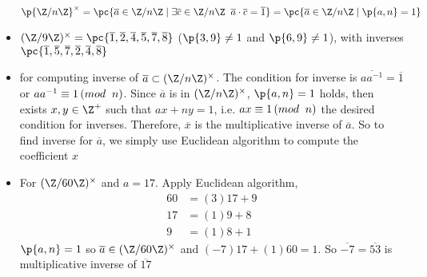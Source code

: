\documentclass[11pt]{article}
\begin{document}
\begin{definition*}
\begin{itemize}
        \[
            \p{\integermodn}^{\times} = \pc{
                \oa \in \integermodn \mid
                \exists \oc \in \integermodn \;\; \oa \cdot \oc = \overline{1}
            } = \pc{
                \oa \in \integermodn \mid \p{a,n} = 1
            }
        \]
        \item {} $\integermodnmul[9] = \pc{\overline{1}, \overline{2}, \overline{4}, \overline{5}, \overline{7}, \overline{8}}$ ($\p{3,9}\neq 1$ and $\p{6,9}\neq 1$), with inverses $\pc{\overline{1}, \overline{5}, \overline{7}, \overline{2}, \overline{4}, \overline{8}}$ 
        \item {} for computing inverse of $\overline{a} \subset \integermodnmul$. The condition for inverse is $\overline{a a^{-1}} = \overline{1}$ or $aa^{-1} \equiv 1 \left(mod \;\; n \right)$. Since $\overline{a}$ is in $\integermodnmul$, $\p{a,n}=1$ holds, then exists $x,y\in \Z^+$ such that $ax + ny = 1$, i.e. $ax \equiv 1 \left(mod \;\; n \right)$ the desired condition for inverses. Therefore, $\overline{x}$ is the multiplicative inverse of $\overline{a}$. So to find inverse for $\overline{a}$, we simply use Euclidean algorithm to compute the coefficient $x$
        \item {} For $\integermodnmul[60]$ and $a=17$. Apply Euclidean algorithm, 
        \begin{align*}
            60 &= (3) 17 + 9 \\
            17 &= (1) 9  + 8 \\
            9  &= (1) 8  + 1
        \end{align*}
        $\p{a,n}=1$ so $\oa \in \integermodnmul[60]$ and $(-7)17 + (1)60 = 1$. So $\overline{-7} = \overline{53}$ is multiplicative inverse of $\overline{17}$
    \end{itemize}
\end{definition*} 



 
\end{document}
